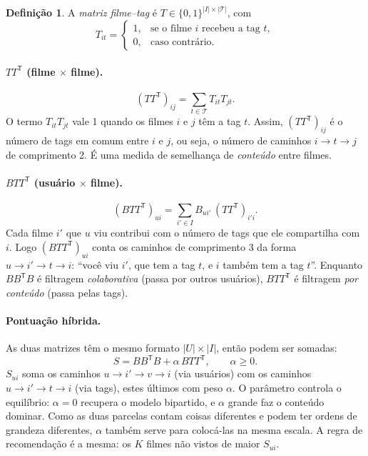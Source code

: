 \documentclass[12pt,a4paper]{article}
\theoremstyle{definition}
\newtheorem{definicao}{Definição}
\begin{document}
\begin{definicao}
A \emph{matriz filme--tag} é $T \in \{0,1\}^{|I| \times |\mathcal{T}|}$, com
\[
  T_{it} =
  \begin{cases}
    1, & \text{se o filme } i \text{ recebeu a tag } t,\\
    0, & \text{caso contrário.}
  \end{cases}
\]
\end{definicao}


\paragraph{$TT^{\mathsf T}$ (filme $\times$ filme).}
\[
  (TT^{\mathsf T})_{ij} = \sum_{t \in \mathcal{T}} T_{it} T_{jt}.
\]
O termo $T_{it}T_{jt}$ vale 1 quando os filmes $i$ e $j$ têm a tag $t$.
Assim, $(TT^{\mathsf T})_{ij}$ é o número de tags em comum entre $i$ e $j$,
ou seja, o número de caminhos $i \to t \to j$ de comprimento 2. É uma
medida de semelhança de \emph{conteúdo} entre filmes.

\paragraph{$BTT^{\mathsf T}$ (usuário $\times$ filme).}
\[
  (BTT^{\mathsf T})_{ui} = \sum_{i' \in I} B_{ui'}\,(TT^{\mathsf T})_{i'i}.
\]
Cada filme $i'$ que $u$ viu contribui com o número de tags que ele
compartilha com $i$. Logo $(BTT^{\mathsf T})_{ui}$ conta os caminhos de
comprimento 3 da forma $u \to i' \to t \to i$: ``você viu $i'$, que tem a
tag $t$, e $i$ também tem a tag $t$''. Enquanto $BB^{\mathsf T}B$ é
filtragem \emph{colaborativa} (passa por outros usuários),
$BTT^{\mathsf T}$ é filtragem \emph{por conteúdo} (passa pelas tags).

\paragraph{Pontuação híbrida.}
As duas matrizes têm o mesmo formato $|U| \times |I|$, então podem ser
somadas:
\[
  S = BB^{\mathsf T}B + \alpha\, BTT^{\mathsf T}, \qquad \alpha \geq 0.
\]
$S_{ui}$ soma os caminhos $u \to i' \to v \to i$ (via usuários) com os
caminhos $u \to i' \to t \to i$ (via tags), estes últimos com peso
$\alpha$. O parâmetro controla o equilíbrio: $\alpha = 0$ recupera o
modelo bipartido, e $\alpha$ grande faz o conteúdo dominar. Como as duas
parcelas contam coisas diferentes e podem ter ordens de grandeza
diferentes, $\alpha$ também serve para colocá-las na mesma escala. A regra
de recomendação é a mesma: os $K$ filmes não vistos de maior $S_{ui}$.
\end{document}
